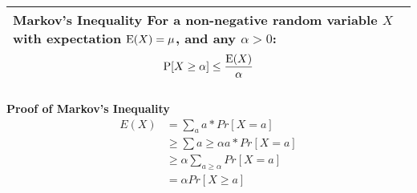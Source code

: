 {\tabulinesep=1mm
\begin{tabu}{|p{16cm} |}
\hline
\vspace{2 mm}
\textbf{Markov's Inequality } \newline
For a non-negative random variable $X$ with expectation $\text{E}(X) = \mu$, 
and any  $\alpha > 0$:
\[\text{P}[X \geq \alpha] \leq \frac{\text{E}(X)}{\alpha}\]
\vspace{2 mm}
\\
\hline
\end{tabu}
}

\begin{solution}
\textbf{Proof of Markov's Inequality}\newline
\begin{equation}
\begin{split}
E(X) &= \sum_a a * Pr[X = a] \\ \nonumber
&\geq \sum{a \geq \alpha} a *  Pr[X = a] \\
&\geq \alpha \sum_{a \geq \alpha} Pr[X = a] \\
&= \alpha Pr[X \geq a]
\end{split}
\end{equation}
\end{solution}